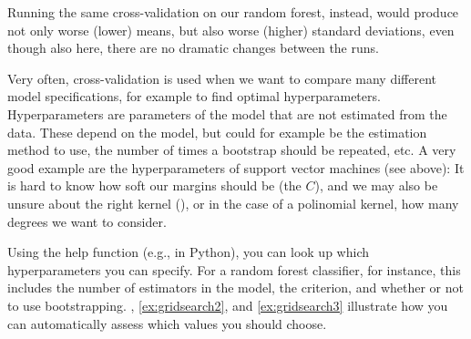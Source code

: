 Running the same cross-validation on our random forest, instead, would
produce not only worse (lower) means, but also worse (higher) standard
deviations, even though also here, there are no dramatic changes
between the runs.


Very often, cross-validation is used when we want to compare many
different model specifications, for example to find optimal
hyperparameters.
Hyperparameters are parameters of the model that are not estimated
from the data. These depend on the model, but could for example be the
estimation method to use, the number of times a bootstrap should be
repeated, etc. A very good example are the hyperparameters of support
vector machines (see above): It is hard to know how soft our margins
should be (the $C$), and we may also be unsure about the right kernel
(), or in the case of a polinomial kernel, how many
degrees we want to consider.

Using the help function (e.g.,  in Python),
you can look up
which hyperparameters you can specify. For a random forest classifier,
for instance, this includes the number of estimators in the model, the
criterion, and whether or not to use
bootstrapping. , \ref{ex:gridsearch2}, and
\ref{ex:gridsearch3} illustrate how you can automatically assess which
values you should choose.




